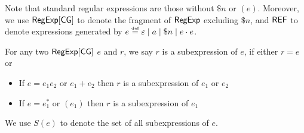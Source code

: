 Note that standard regular expressions are those without $\$ n$ or $(e)$. Moreover, we use ${\sf RegExp}[\sf CG]$ to denote the fragment of ${\sf RegExp}$  excluding $\$ n$, and ${\sf REF}$ to denote expressions generated by $e \eqdef \varepsilon \mid a \mid \$n \mid e \concat e$.
  
  
  
  
  
  \begin{definition}[Subexpression]
  	For any two ${\sf RegExp}[\sf CG]$ $e$ and $r$, we say $r$ is a subexpression of $e$,
  	if either $r=e$ or
  	\begin{itemize}
  		\item If $e = e_1 e_2$ or $e_1 + e_2$ then $r$ is a subexpression of $e_1$
  		or $e_2$
  		
  		\item If $e = e_1^{\ast}$ or $(e_1)$ then $r$ is a subexpression of $e_1$
  	\end{itemize}
  	We use $S (e)$ to denote the set of all subexpressions of $e$.
  \end{definition}
  
